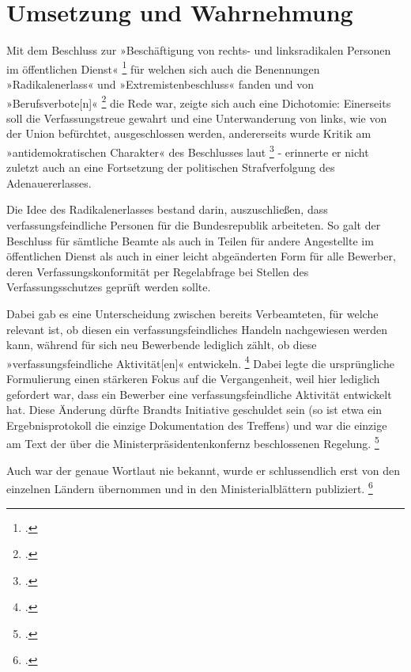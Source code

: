 \documentclass[12pt]{scrartcl}
\begin{document}
\section{Umsetzung und Wahrnehmung}

Mit dem Beschluss zur »Beschäftigung von rechts- und linksradikalen Personen im öffentlichen Dienst« \footcite[][S. 342]{noauthor_ministerialblatt_1972} für welchen sich auch die Benennungen »Radikalenerlass« und »Extremistenbeschluss« fanden und von »Berufsverbote[n]« \footcite[][S. 409]{gebhardt_handbuch_2001} die Rede war, zeigte sich auch eine Dichotomie: Einerseits soll die Verfassungstreue gewahrt und eine Unterwanderung von links, wie von der Union befürchtet, ausgeschlossen werden, andererseits wurde Kritik am »antidemokratischen Charakter« des Beschlusses laut \footcite[][S. 409]{gebhardt_handbuch_2001} - erinnerte er nicht zuletzt auch an eine Fortsetzung der politischen Strafverfolgung des Adenauererlasses.

Die Idee des Radikalenerlasses bestand darin, auszuschließen, dass verfassungsfeindliche Personen für die Bundesrepublik arbeiteten. So galt der Beschluss für sämtliche Beamte als auch in Teilen für andere Angestellte im öffentlichen Dienst als auch in einer leicht abgeänderten Form für alle Bewerber, deren Verfassungskonformität per Regelabfrage bei Stellen des Verfassungsschutzes geprüft werden sollte.

Dabei gab es eine Unterscheidung zwischen bereits Verbeamteten, für welche relevant ist, ob diesen ein verfassungsfeindliches Handeln nachgewiesen werden kann, während für sich neu Bewerbende lediglich zählt, ob diese »verfassungsfeindliche Aktivität[en]« entwickeln. \footcite[Vgl. Abs. 2.1.1 und 2.2][S. 342]{noauthor_ministerialblatt_1972} Dabei legte die ursprüngliche Formulierung einen stärkeren Fokus auf die Vergangenheit, weil hier lediglich gefordert war, dass ein Bewerber eine verfassungsfeindliche Aktivität entwickelt hat. Diese Änderung dürfte Brandts Initiative geschuldet sein (so ist etwa ein Ergebnisprotokoll die einzige Dokumentation des Treffens) und war die einzige am Text der über die Ministerpräsidentenkonfernz beschlossenen Regelung. \footcite[Vgl.][S. 340f]{rigoll_staatsschutz_2013}

Auch war der genaue Wortlaut nie bekannt, wurde er schlussendlich erst von den einzelnen Ländern übernommen und in den Ministerialblättern publiziert. \footcite[][S. 342]{rigoll_staatsschutz_2013}
\end{document}
